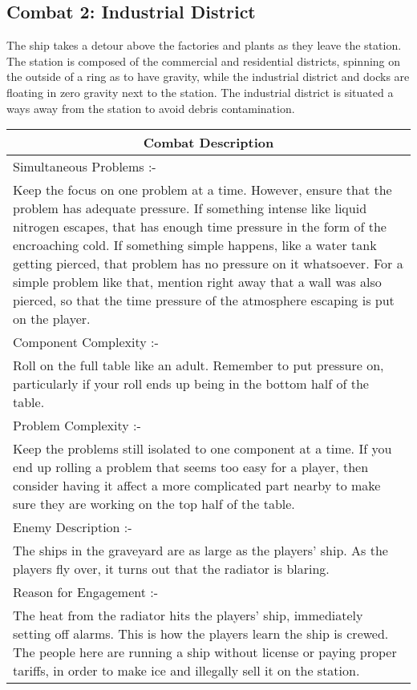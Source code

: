 \documentclass[a4paper]{article}
\begin{document}
\subsection{Combat 2: Industrial District} \label{combat_2}
The ship takes a detour above the factories and plants as they leave the station. The station is composed of the commercial and residential districts, spinning on the outside of a ring as to have gravity, while the industrial district and docks are floating in zero gravity next to the station. The industrial district is situated a ways away from the station to avoid debris contamination.
\begin{minipage}[t]{0.5\linewidth}
\begin{tabular}[t]{| p{7cm} |}
\toprule
\multicolumn{1}{|c|}{Combat Description} \\
\midrule
Simultaneous Problems :- \\
Keep the focus on one problem at a time. However, ensure that the problem has adequate pressure. If something intense like liquid nitrogen escapes, that has enough time pressure in the form of the encroaching cold. If something simple happens, like a water tank getting pierced, that problem has no pressure on it whatsoever. For a simple problem like that, mention right away that a wall was also pierced, so that the time pressure of the atmosphere escaping is put on the player. \\	
\midrule
Component Complexity :- \\
Roll on the full table like an adult. Remember to put pressure on, particularly if your roll ends up being in the bottom half of the table. \\
\midrule
Problem Complexity :- \\
Keep the problems still isolated to one component at a time. If you end up rolling a problem that seems too easy for a player, then consider having it affect a more complicated part nearby to make sure they are working on the top half of the table. \\
\midrule
Enemy Description :- \\
The ships in the graveyard are as large as the players' ship. As the players fly over, it turns out that the radiator is blaring. \\
\midrule
Reason for Engagement :- \\
The heat from the radiator hits the players' ship, immediately setting off alarms. This is how the players learn the ship is crewed. The people here are running a ship without license or paying proper tariffs, in order to make ice and illegally sell it on the station. \\
\bottomrule
\end{tabular}
\end{minipage}
\end{document}
